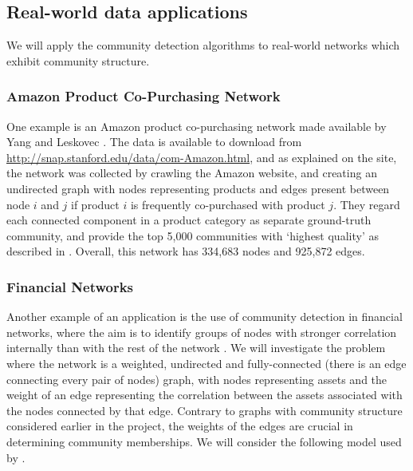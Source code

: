 \documentclass[12pt]{article}
\numberwithin{equation}{section}
\begin{document}
\subsection{Real-world data applications}
\label{subsec:communityDetectionApplicationToRealWorldData}

We will apply the community detection algorithms to real-world networks which exhibit community structure.

\subsubsection{Amazon Product Co-Purchasing Network}
\label{subsubsec:amazonNetwork}

One example is an Amazon product co-purchasing network made available by Yang and Leskovec \cite{YL12}. The data is available to download from \url{http://snap.stanford.edu/data/com-Amazon.html}, and as explained on the site, the network was collected by crawling the Amazon website, and creating an undirected graph with nodes representing products and edges present between node $i$ and $j$ if product $i$ is frequently co-purchased with product $j$. They regard each connected component in a product category as separate ground-truth community, and provide the top 5,000 communities with `highest quality' as described in \cite{YL12}. Overall, this network has 334,683 nodes and 925,872 edges.

\subsubsection{Financial Networks}
\label{subsubsec:financialNetworks}

Another example of an application is the use of community detection in financial networks, where the aim is to identify groups of nodes with stronger correlation internally than with the rest of the network \cite{MG13}. We will investigate the problem where the network is a weighted, undirected and fully-connected (there is an edge connecting every pair of nodes) graph, with nodes representing assets and the weight of an edge representing the correlation between the assets associated with the nodes connected by that edge. Contrary to graphs with community structure considered earlier in the project, the weights of the edges are crucial in determining community memberships. We will consider the following model used by \cite{OCK+02,OKK03,FPM+10,MG13}.
\end{document}
